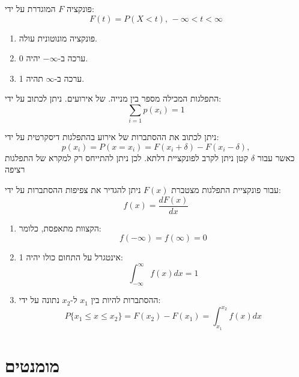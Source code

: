 \documentclass{tstextbook}
\begin{document}
\begin{definition}
פונקציה \(F\) המוגדרת על ידי:
$$F(t)=P(X<t),\,-\infty<t<\infty$$

\end{definition}
\begin{proposition}
  \begin{enumerate}
    \item פונקציה מונוטונית עולה. 


    \item ערכה ב-\(-\infty\) יהיה 0. 


    \item ערכה ב-\(\infty\) תהיה 1. 


  \end{enumerate}
\end{proposition}
\begin{definition}
התפלגות המכילה מספר בין מנייה. של אירועים. ניתן לכתוב על ידי:
$$\sum_{i=1}p(x_{i})=1$$

\end{definition}
\begin{proposition}
ניתן לכתוב את ההסתברות של אירוע בהתפלגות דיסקרטית על ידי:
$$p(x_{i})=P(x=x_{i})=F(x_{i}+\delta)-F(x_{i}-\delta),$$
כאשר עבור \(\delta\) קטן ניתן לקרב לפונקציית דלתא. לכן ניתן להתייחס רק למקרא של התפלגות רציפה

\end{proposition}
\begin{definition}
עבור פונקציית התפלגות מצטברת \(F(x)\) ניתן להגדיר את צפיפות ההסתברות על ידי:
$$f(x)=\frac{d F(x)}{d x}$$

\end{definition}
\begin{proposition}
  \begin{enumerate}
    \item הקצוות מתאפסת, כלומר: 
$$f(-\infty)=f(\infty)=0$$


    \item אינטגרל על התחום כולו יהיה 1: 
$$\int_{-\infty}^{\infty}f(x)d x=1$$


    \item ההסתברות להיות בין \(x_{1}\) ל-\(x_{2}\) נתונה על ידי: 
$$P\{x_{1}\leq x\leq x_{2}\}=F(x_{2})-F(x_{1})=\int_{x_{1}}^{x_{2}}f(x)d x$$


  \end{enumerate}
\end{proposition}
\section{מומנטים}
\end{document}
